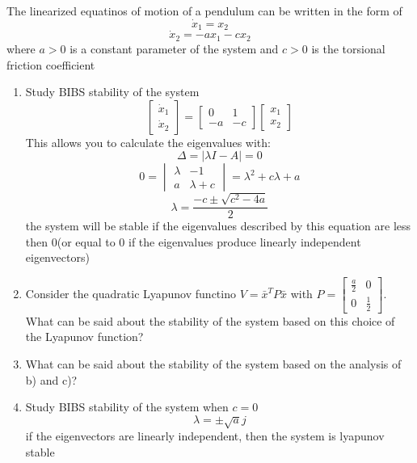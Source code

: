 \item The linearized equatinos of motion of a pendulum can be written in the form of
  \begin{equation}
    \dot x_1 = x_2
  \end{equation}
  \begin{equation}
    \dot x_2 = -ax_1 - cx_2
  \end{equation}
  where $a > 0$ is a constant parameter of the system and $c > 0$ is the torsional friction coefficient
  \begin{enumerate}
  \item Study BIBS stability of the system\\
    \begin{equation}
      \begin{bmatrix}
        \dot x_1 \\
        \dot x_2 
      \end{bmatrix} =
      \begin{bmatrix}
        0 & 1 \\
        -a & -c
      \end{bmatrix}
      \begin{bmatrix}
        x_1 \\
        x_2
      \end{bmatrix}
    \end{equation}
    This allows you to calculate the eigenvalues with:
    \begin{equation}
      \Delta = \vert \lambda I - A \vert = 0
    \end{equation}
    \begin{equation}
      0 =
      \begin{vmatrix}
        \lambda & -1 \\
        a & \lambda + c
      \end{vmatrix} =
      \lambda^2 + c\lambda + a
    \end{equation}
    \begin{equation}
      \lambda = \frac{-c \pm \sqrt{c^2 - 4a}}{2}
    \end{equation}
    the system will be stable if the eigenvalues described by this equation are less then 0(or equal to 0 if
    the eigenvalues produce linearly independent eigenvectors)
  \item Consider the quadratic Lyapunov functino $V = \bar x^T P \bar x$ with
    $P = \begin{bmatrix} \frac a 2 & 0 \\ 0 & \frac 1 2\end{bmatrix}$. What can be said about the stability of
    the system based on this choice of the Lyapunov function?
  \item What can be said about the stability of the system based on the analysis of b) and c)?
  \item Study BIBS stability of the system when $c=0$ \\
    \begin{equation}
      \lambda = \pm \sqrt{a}j
    \end{equation}
    if the eigenvectors are linearly independent, then the system is lyapunov stable
  \end{enumerate}